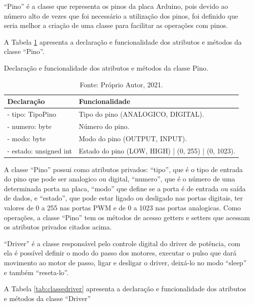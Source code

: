 “Pino” é a classe que representa os pinos da placa Arduino, pois devido ao número alto de vezes que foi 
necessário a utilização dos pinos, foi definido que seria melhor a criação de uma classe para facilitar 
as operações com pinos. 

A Tabela \ref{tab:classepino} apresenta a declaração e funcionalidade dos atributos e métodos da 
classe “Pino”.

\begin{table}[H]
    \footnotesize
    \centering
    \caption{Declaração e funcionalidade dos atributos e métodos da classe Pino.}
    \begin{tabular}{lp{9cm}}
        \hline
        \textbf{Declaração} & \textbf{Funcionalidade}\\
        \hline
        - tipo: TipoPino & Tipo do pino (ANALOGICO, DIGITAL).\\
        - numero: byte & Número do pino.\\
        - modo: byte & Modo do pino (OUTPUT, INPUT).\\
        - estado: unsigned int & Estado do pino (LOW, HIGH) | (0, 255) | (0, 1023).\\
        \hline       
    \end{tabular}
    \caption*{Fonte: Próprio Autor, 2021.}
    \label{tab:classepino}
\end{table}

A classe “Pino” possui como atributos privados: “tipo”, que é o tipo de entrada do pino que pode ser 
analogico ou digital, “numero”, que é o número de uma determinada porta na placa, “modo” que define se 
a porta é de entrada ou saída de dados, e “estado”, que pode estar ligado ou desligado nas portas digitais, 
ter valores de 0 a 255 nas portas \ac{PWM} e de 0 a 1023 nas portas analogicas. Como operações, a classe “Pino” 
tem os métodos de acesso getters e setters que acessam os atributos privados citados acima.

“Driver” é a classe responsável pelo controle digital do driver de potência, com ela é possível definir 
o modo do passo dos motores, executar o pulso que dará movimento ao motor de passo, ligar e desligar 
o driver, deixá-lo no modo “sleep” e também “reseta-lo”.

A Tabela \ref{tab:classedriver} apresenta a declaração e funcionalidade dos atributos e métodos da 
classe “Driver”

